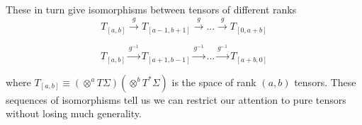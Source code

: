     These in turn give isomorphisms between tensors of different ranks
        \begin{equation}
            T_{[a,b]} \xrightarrow{g} T_{[a-1,b+1]}  \xrightarrow{g} ... \xrightarrow{g}  T_{[0,a + b]}
        \end{equation}

        \begin{equation}
            T_{[a,b]} \xrightarrow{g^{-1}} T_{[a+1,b-1]}  \xrightarrow{g^{-1}} ... \xrightarrow{g^{-1}}  T_{[a + b,0]}
        \end{equation}

    where $T_{[a,b]} \equiv (\otimes^a T\Sigma)(\otimes^b T^*\Sigma)$ is the space of rank $(a, b)$ tensors. These sequences of isomorphisms tell us we can restrict our attention to pure tensors without losing much generality.
